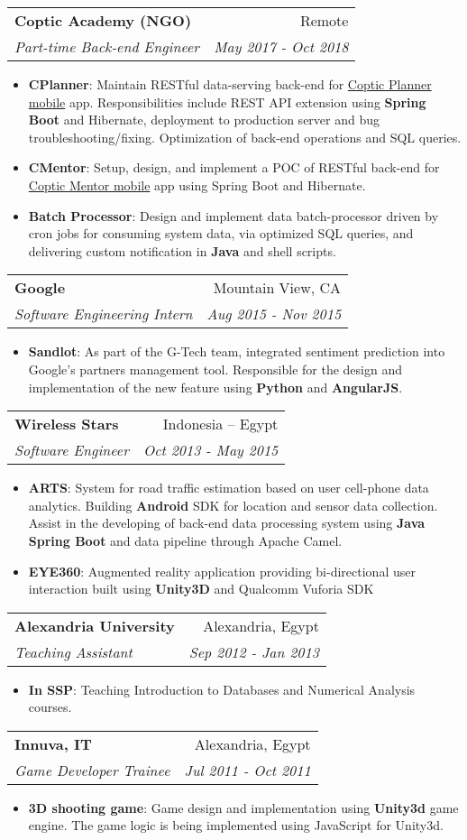 \documentclass[letterpaper,11pt]{article}
\makeatletter
\newcommand{\resumeItem}[2]{
  \item\small{
    \textbf{#1}{: #2 \vspace{-2pt}}
  }
}
\newcommand{\resumeSubheading}[4]{
  \vspace{-1pt}\item
    \begin{tabular*}{0.97\textwidth}[t]{l@{\extracolsep{\fill}}r}
      \textbf{#1} & #2 \\
      \textit{\small #3} & \textit{\small #4} \\
    \end{tabular*}\vspace{-5pt}
}
\newcommand{\resumeItemListStart}{\begin{itemize}}
\newcommand{\resumeItemListEnd}{\end{itemize}\vspace{-5pt}}
\makeatother
\begin{document}
    \resumeSubheading
      {Coptic Academy (NGO)}{Remote}
      {Part-time Back-end Engineer}{May 2017 - Oct 2018}
      \resumeItemListStart
        \resumeItem{CPlanner}
          {Maintain RESTful data-serving back-end for \href{https://play.google.com/store/apps/details?id=org.copticacademy}{Coptic Planner mobile} app. Responsibilities include REST API extension using \textbf{Spring Boot} and Hibernate, deployment to production server and bug troubleshooting/fixing. Optimization of back-end operations and SQL queries.}
        \resumeItem{CMentor}
          {Setup, design, and implement a POC of RESTful back-end for \href{https://play.google.com/store/apps/details?id=org.copticacademy.CopticMentor}{Coptic Mentor mobile} app using Spring Boot and Hibernate.}
        \resumeItem{Batch Processor}
          {Design and implement data batch-processor driven by cron jobs for consuming system data, via optimized SQL queries, and delivering custom notification in \textbf{Java} and shell scripts.}
      \resumeItemListEnd

    \resumeSubheading
      {Google}{Mountain View, CA}
      {Software Engineering Intern}{Aug 2015 - Nov 2015}
      \resumeItemListStart
        \resumeItem{Sandlot}
          {As part of the G-Tech team, integrated sentiment prediction into Google's partners management tool. Responsible for the design and implementation of the new feature using \textbf{Python}
and \textbf{AngularJS}.}
      \resumeItemListEnd

    \resumeSubheading
      {Wireless Stars}{Indonesia -- Egypt}
      {Software Engineer}{Oct 2013 - May 2015}
      \resumeItemListStart
        \resumeItem{ARTS}
          {System for road traffic estimation based on user cell-phone data analytics. Building \textbf{Android} SDK for location and sensor data collection.\\
          Assist in the developing of back-end data processing system using \textbf{Java Spring Boot} and data pipeline through Apache Camel.}
        \resumeItem{EYE360}
          {Augmented reality application providing bi-directional user interaction built using \textbf{Unity3D} and Qualcomm Vuforia SDK}
      \resumeItemListEnd

    \resumeSubheading
      {Alexandria University}{Alexandria, Egypt}
      {Teaching Assistant}{Sep 2012 - Jan 2013}
      \resumeItemListStart
        \resumeItem{In SSP}
          {Teaching Introduction to Databases and Numerical Analysis courses.}
      \resumeItemListEnd

    \resumeSubheading
      {Innuva, IT}{Alexandria, Egypt}
      {Game Developer Trainee}{Jul 2011 - Oct 2011}
      \resumeItemListStart
        \resumeItem{3D shooting game}
          {Game design and implementation using \textbf{Unity3d} game engine. The game logic is being implemented using JavaScript for Unity3d.}
      \resumeItemListEnd
\end{document}
